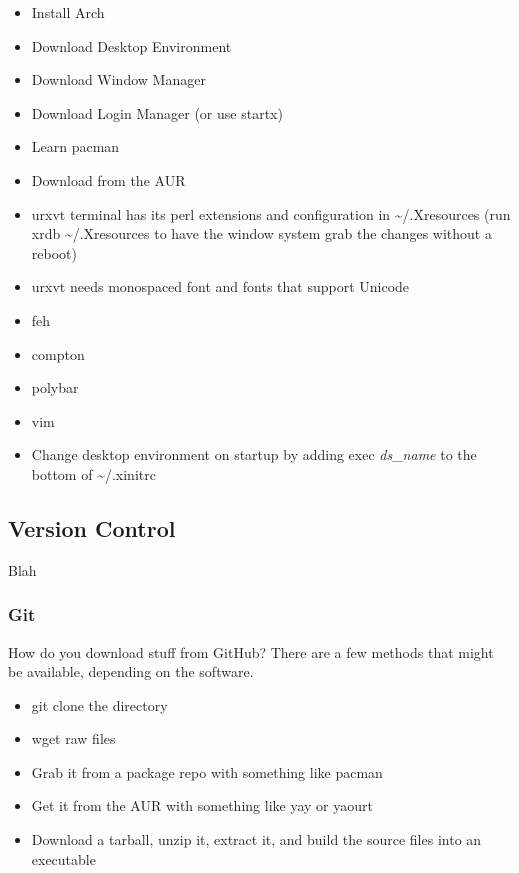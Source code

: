 \begin{itemize}
	\item Install Arch
	\item Download Desktop Environment
	\item Download Window Manager
	\item Download Login Manager (or use startx)
	\item Learn pacman
	\item Download from the AUR
	\item urxvt terminal has its perl extensions and configuration in \textasciitilde/.Xresources (run xrdb \textasciitilde/.Xresources to have the window system grab the changes without a reboot)
	\item urxvt needs monospaced font and fonts that support Unicode
	\item feh
	\item compton
	\item polybar
	\item vim
	\item Change desktop environment on startup by adding exec \textit{ds\_name} to the bottom of \textasciitilde/.xinitrc
\end{itemize}


\subsection{Version Control}

Blah

\subsubsection{Git}

How do you download stuff from GitHub? There are a few methods that might be available, depending on the software.
\begin{itemize}
	\item git clone the directory
	\item wget raw files
	\item Grab it from a package repo with something like pacman
	\item Get it from the AUR with something like yay or yaourt
	\item Download a tarball, unzip it, extract it, and build the source files into an executable
\end{itemize}

